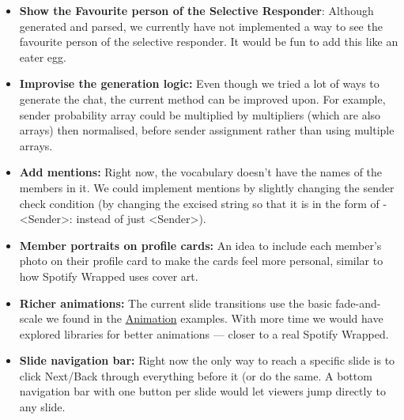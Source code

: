\documentclass[12pt]{article}
\begin{document}
\begin{itemize}
    \item \textbf{Show the Favourite person of the Selective Responder}: Although generated and parsed, we currently have not implemented a way to see the favourite person of the selective responder. It would be fun to add this like an eater egg.
    
    \item \textbf{Improvise the generation logic:} Even though we tried a lot of ways to generate the chat, the current method can be improved upon. For example, sender probability array could be multiplied by multipliers (which are also arrays) then normalised, before sender assignment rather than using multiple arrays.
    
    \item \textbf{Add mentions:} Right now, the vocabulary doesn't have the names of the members in it. We could implement mentions by slightly changing the sender check condition (by changing the excised string so that it is in the form of - <Sender>: instead of just <Sender>).
    
    \item \textbf{Member portraits on profile cards:} An idea to
include each member's photo on their profile card to make the cards feel more
personal, similar to how Spotify Wrapped uses cover art.

\item \textbf{Richer animations:} The current slide transitions use the
basic fade-and-scale we found in the \href{https://www.w3schools.com/css/css3_animations.asp}{Animation} examples. With more time we
would have explored libraries for better animations --- closer to a real
Spotify Wrapped.

\item \textbf{Slide navigation bar:} Right now the only way to reach a
specific slide is to click Next/Back through everything before it (or do the same. A bottom
navigation bar with one button per slide would let viewers
jump directly to any slide.
\end{itemize}

\nocite{*}


\end{document}
